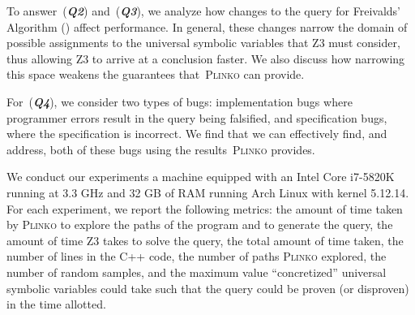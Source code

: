 \documentclass[acmsmall,review,anonymous]{acmart}\settopmatter{printfolios=true,printccs=false,printacmref=false}
\newcommand{\SYSTEM}{\textsc{Plinko}\xspace}
\newcommand{\Q}[1]{(\textit{\textbf{Q#1}})}
\begin{document}
To answer~\Q{2} and~\Q{3}, we analyze how changes to the query for Freivalds' Algorithm () affect performance.
% 
In general, these changes narrow the domain of possible assignments to the universal symbolic variables that Z3 must consider, thus allowing Z3 to arrive at a conclusion faster.
%
We also discuss how narrowing this space weakens the guarantees that~\SYSTEM can provide.
% 

For~\Q{4}, we consider two types of bugs: implementation bugs where programmer errors result in the query being falsified, and specification bugs, where the specification is incorrect.
%
We find that we can effectively find, and address, both of these bugs using the results~\SYSTEM provides.


We conduct our experiments a machine equipped with an Intel Core i7-5820K running at 3.3 GHz and 32 GB of RAM running Arch Linux with kernel 5.12.14.
% 
For each experiment, we report the following metrics: the amount of time taken by \SYSTEM to explore the paths of the program and to generate the query, the amount of time Z3 takes to solve the query, the total amount of time taken, the number of lines in the C++ code, the number of paths \SYSTEM  explored, the number of random samples, and the maximum value ``concretized'' universal symbolic variables could take such that the query could be proven (or disproven) in the time allotted.
\end{document}
